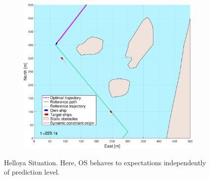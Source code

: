 \begin{figure}[!ht]
\begin{subfigure}[b]{0.494\textwidth}
        \subcaption{}
    \end{subfigure}
    \hfill
    \begin{subfigure}[b]{0.494\textwidth}
        \centering
        \includegraphics[width=\textwidth]{Images/NewFigures/Helloya/_Simple_0fig999_time=230}
        \subcaption{}
    \end{subfigure}
    \hfill
    \caption{Helloya Situation. Here, \gls{OS} behaves to expectations independently of prediction level.}
    \label{FIG: Helloya normal}
\end{figure}%
